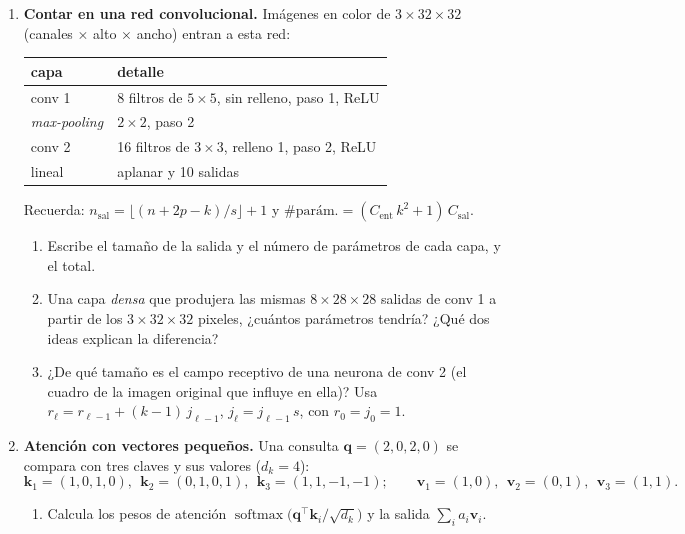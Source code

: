 \documentclass[11pt]{article}
\newcommand{\T}{^{\top}}
\newcommand{\espacio}[1]{\par\vspace{#1}}
\newcommand{\nuevapagina}{\newpage}
\begin{document}
\begin{enumerate}
\nuevapagina
\item \textbf{Contar en una red convolucional.} Imágenes en color de $3 \times 32 \times 32$ (canales $\times$ alto $\times$ ancho) entran a esta red:
\begin{center}
\begin{tabular}{ll}
\toprule
capa & detalle \\ \midrule
conv 1 & 8 filtros de $5 \times 5$, sin relleno, paso 1, ReLU \\
\textit{max-pooling} & $2 \times 2$, paso 2 \\
conv 2 & 16 filtros de $3 \times 3$, relleno 1, paso 2, ReLU \\
lineal & aplanar y 10 salidas \\
\bottomrule
\end{tabular}
\end{center}
Recuerda: $n_{\text{sal}} = \lfloor (n + 2p - k)/s \rfloor + 1$ y $\#\text{parám.} = (C_{\text{ent}}\,k^2 + 1)\,C_{\text{sal}}$.
\begin{enumerate}
  \item Escribe el tamaño de la salida y el número de parámetros de cada capa, y el total.
  \espacio{4cm}

  \item Una capa \emph{densa} que produjera las mismas $8 \times 28 \times 28$ salidas de conv 1 a partir de los $3 \times 32 \times 32$ pixeles, ¿cuántos parámetros tendría? ¿Qué dos ideas explican la diferencia?
  \espacio{2.5cm}

  \item ¿De qué tamaño es el campo receptivo de una neurona de conv 2 (el cuadro de la imagen original que influye en ella)? Usa $r_\ell = r_{\ell-1} + (k-1)\,j_{\ell-1}$, $j_\ell = j_{\ell-1}\,s$, con $r_0 = j_0 = 1$.
  \espacio{2.5cm}
\end{enumerate}

\nuevapagina
\item \textbf{Atención con vectores pequeños.} Una consulta $\mathbf q = (2, 0, 2, 0)$ se compara con tres claves y sus valores ($d_k = 4$):
\[
\mathbf k_1 = (1, 0, 1, 0),\ \ \mathbf k_2 = (0, 1, 0, 1),\ \ \mathbf k_3 = (1, 1, -1, -1); \qquad \mathbf v_1 = (1, 0),\ \ \mathbf v_2 = (0, 1),\ \ \mathbf v_3 = (1, 1).
\]
\begin{enumerate}
  \item Calcula los pesos de atención $\operatorname{softmax}\big(\mathbf q\T\mathbf k_i / \sqrt{d_k}\big)$ y la salida $\sum_i a_i \mathbf v_i$.
  \espacio{3.5cm}


\end{enumerate}
\end{enumerate}
\end{document}
